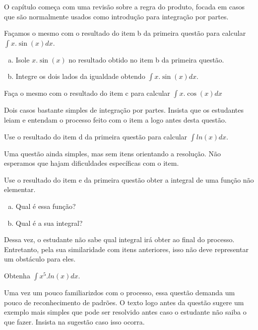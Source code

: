 \documentclass[main_estudante.tex]{subfiles}
\begin{document}
O capítulo começa com uma revisão sobre a regra do produto, focada em casos que são normalmente usados como introdução para integração por partes.

\begin{questao}
Façamos o mesmo com o resultado do item b da primeira questão para calcular $\int x . \sin(x) dx$.
\begin{enumerate}[a)]
\item Isole $x . \sin(x)$ no resultado obtido no item b da primeira questão.
\item Integre os dois lados da igualdade obtendo $\int x . \sin(x) dx$.
\end{enumerate}
\end{questao}

\begin{questao}
Faça o mesmo com o resultado do item c para calcular $\int x . \cos(x) dx$
\end{questao}

Dois casos bastante simples de integração por partes. Insista que os estudantes leiam e entendam o processo feito com o item a logo antes desta questão.

\begin{questao}
Use o resultado do item d da primeira questão para calcular $\int ln(x) dx$.
\end{questao}

Uma questão ainda simples, mas sem itens orientando a resolução. Não esperamos que hajam dificuldades específicas com o item.

\begin{questao}
Use o resultado do item e da primeira questão obter a integral de uma função não elementar.
\begin{enumerate}[a)]
\item Qual é essa função?
\item Qual é a sua integral?
\end{enumerate}
\end{questao}

Dessa vez, o estudante não sabe qual integral irá obter ao final do processo. Entretanto, pela sua similaridade com itens anteriores, isso não deve representar um obstáculo para eles.

\begin{questao}
Obtenha $\int x^5 . ln(x) dx$.
\end{questao}

Uma vez um pouco familiarizdos com o processo, essa questão demanda um pouco de reconhecimento de padrões. O texto logo antes da questão sugere um exemplo mais simples que pode ser resolvido antes caso o estudante não saiba o que fazer. Insista na sugestão caso isso ocorra.
\end{document}
